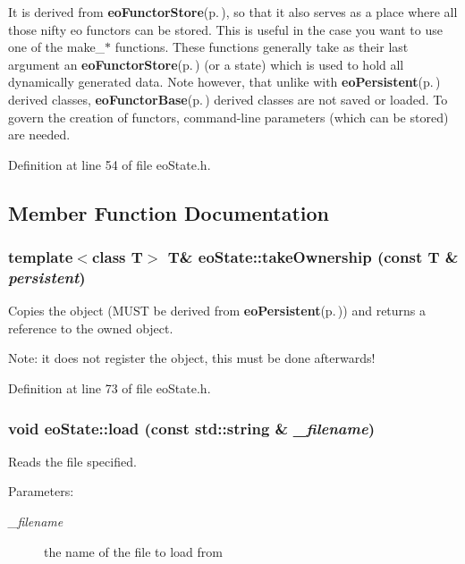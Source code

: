It is derived from {\bf eo\-Functor\-Store}{\rm (p.\,\pageref{classeo_functor_store})}, so that it also serves as a place where all those nifty eo functors can be stored. This is useful in the case you want to use one of the make\_\-$\ast$ functions. These functions generally take as their last argument an {\bf eo\-Functor\-Store}{\rm (p.\,\pageref{classeo_functor_store})} (or a state) which is used to hold all dynamically generated data. Note however, that unlike with {\bf eo\-Persistent}{\rm (p.\,\pageref{classeo_persistent})} derived classes, {\bf eo\-Functor\-Base}{\rm (p.\,\pageref{classeo_functor_base})} derived classes are not saved or loaded. To govern the creation of functors, command-line parameters (which can be stored) are needed. 



Definition at line 54 of file eo\-State.h.

\subsection{Member Function Documentation}
\subsubsection{\setlength{\rightskip}{0pt plus 5cm}template$<$class T$>$ T\& eo\-State::take\-Ownership (const T \& {\em persistent})\hspace{0.3cm}{\tt  [inline]}}\label{classeo_state_a3}


Copies the object (MUST be derived from {\bf eo\-Persistent}{\rm (p.\,\pageref{classeo_persistent})}) and returns a reference to the owned object. 

Note: it does not register the object, this must be done afterwards! 

Definition at line 73 of file eo\-State.h.
\subsubsection{\setlength{\rightskip}{0pt plus 5cm}void eo\-State::load (const std::string \& {\em \_\-filename})}\label{classeo_state_a5}


Reads the file specified. 

\begin{Desc}
\item[Parameters:]
\begin{description}
\item[{\em \_\-filename}]the name of the file to load from \end{description}
\end{Desc}


